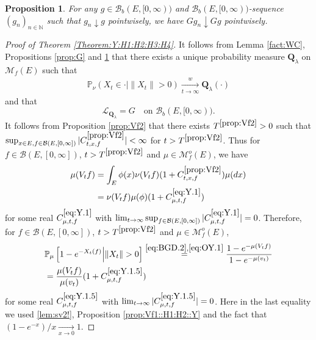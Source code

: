 \documentclass[12pt,a4paper]{amsart}
\numberwithin{equation}{section}
\theoremstyle{plain}
\newtheorem{prop}[thm]{Proposition}
\theoremstyle{definition}
\theoremstyle{remark}
\begin{document}
\begin{prop} \label{prop::GD:H1:H2:H3:H4::Y}
	For any $g\in \mathcal B_b(E,[0,\infty))$ and $\mathcal B_b(E,[0,\infty))$-sequence $(g_n)_{n\in \mathbb N}$ such that $g_n \downarrow g$ pointwisely,
we have $G g_n \downarrow Gg$ pointwisely.
\end{prop}

\begin{proof}[Proof of Theorem \ref{Theorem:Y:H1:H2:H3:H4}]
	It follows from Lemma \ref{fact:WC}, Propositions \ref{prop:G} and \ref{prop::GD:H1:H2:H3:H4::Y} that there exists a unique probability measure $\mathbf Q_\lambda$ on $\mathcal M_f(E)$ such that
\begin{align}\label{eq:Y.0}
 	\mathbb P_{\nu}(X_t \in \cdot | \|X_t\|>0 )
\xrightarrow[t\to \infty]{w} \mathbf Q_\lambda(\cdot)
\end{align}
	and that
\begin{equation} \label{eq:Y.00}
	\mathscr L_{\mathbf Q_\lambda} = G \quad \mbox{on } \mathcal B_b(E,[0,\infty)).
\end{equation}
	It follows from Proposition \ref{prop:Vf2} that there exists $T^{\ref{prop:Vf2}}>0$ such that $\sup_{x\in E, f \in \mathcal B(E,[0,\infty])} |C^{\ref{prop:Vf2}}_{t,x,f}|< \infty$ for $t>T^{\ref{prop:Vf2}}$.
	Thus for $f \in \mathcal B(E,[0,\infty])$, $t>T^{\ref{prop:Vf2}}$ and $\mu \in \mathcal M_f^o(E)$, we have
\begin{align}
	\mu(V_tf)
	&= \int_E  \phi(x) \nu (V_tf) (1+C^{\ref{prop:Vf2}}_{t,x,f})\mu(dx)
	\\ \label{eq:Y.1} & = \nu(V_tf) \mu(\phi)(1+ C^{\eqref{eq:Y.1}}_{\mu,t,f})
\end{align}
	for some real $C^{\eqref{eq:Y.1}}_{\mu,t,f}$ with
	$\lim_{t\to \infty} \sup_{f \in \mathcal B(E,[0,\infty])}
	|C^{\eqref{eq:Y.1}}_{\mu,t,f}| = 0$.
	Therefore, for $f\in \mathcal B(E,[0,\infty])$,
	$t > T^{\ref{prop:Vf2}}$ and $\mu \in \mathcal M_f^o(E)$,
\begin{align}
	&\mathbb P_\mu \left[1 - e^{-X_t(f)} \middle|\|X_t\|>0\right]
	\overset{\eqref{eq:BGD.2},\eqref{eq:OY.1}}= \frac{1 - e^{- \mu(V_tf)}} {1 - e^{-\mu(v_t)}}
	\\\label{eq:Y.1.5}& = \frac{ \mu(V_t f) }{ \mu(v_t) } (1+C^{\eqref{eq:Y.1.5}}_{\mu,t,f})
\end{align}
	for some real $C^{\eqref{eq:Y.1.5}}_{\mu,t,f}$ with $\lim_{t\to \infty} |C^{\eqref{eq:Y.1.5}}_{\mu,t,f}| = 0$.
	Here in the last equality we used \eqref{lem:sv2!}, Proposition \ref{prop:Vf1::H1:H2::Y} and the fact that $(1-e^{-x})/x \xrightarrow[x\to 0]{}1$.

\end{proof}
\end{document}
